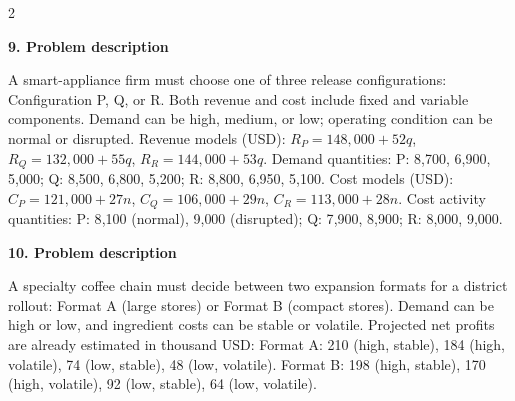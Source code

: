 \documentclass[12pt]{article}
\newcommand{\SubsectionBox}[1]{%
	\noindent\colorbox{gray!30}{%
		\parbox{\dimexpr\linewidth-2\fboxsep\relax}{\textbf{#1}}%
	}\par\vspace{0.35cm}%
}
\begin{document}
\begin{multicols}{2}
		\vspace{0.25cm}
		\SubsectionBox{9. Problem description}\vspace{-0.25cm}
		A smart-appliance firm must choose one of three release configurations:
				Configuration P, Q, or R.
				Both revenue and cost include fixed and variable components.
				Demand can be high, medium, or low; operating condition can be normal or disrupted.
				Revenue models (USD):
				\(R_P=148{,}000+52q\), \(R_Q=132{,}000+55q\), \(R_R=144{,}000+53q\).
				Demand quantities:
				P: 8{,}700, 6{,}900, 5{,}000;
				Q: 8{,}500, 6{,}800, 5{,}200;
				R: 8{,}800, 6{,}950, 5{,}100.
				Cost models (USD):
				\(C_P=121{,}000+27n\), \(C_Q=106{,}000+29n\), \(C_R=113{,}000+28n\).
				Cost activity quantities:
				P: 8{,}100 (normal), 9{,}000 (disrupted);
				Q: 7{,}900, 8{,}900;
				R: 8{,}000, 9{,}000.

		\vspace{0.25cm}
		\SubsectionBox{10. Problem description}\vspace{-0.25cm}
		A specialty coffee chain must decide between two expansion formats for a district rollout:
				Format A (large stores) or Format B (compact stores).
				Demand can be high or low, and ingredient costs can be stable or volatile.
				Projected net profits are already estimated in thousand USD:
				Format A: 210 (high, stable), 184 (high, volatile), 74 (low, stable), 48 (low, volatile).
				Format B: 198 (high, stable), 170 (high, volatile), 92 (low, stable), 64 (low, volatile).

	\end{multicols}
\end{document}
